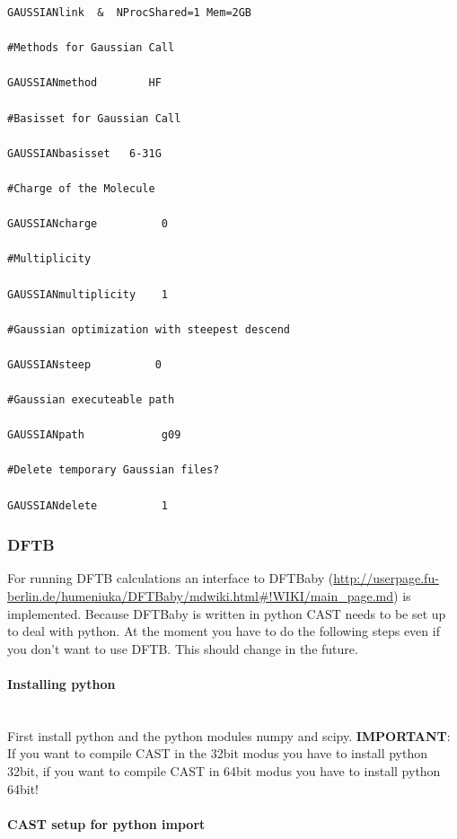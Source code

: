 \documentclass[10pt,a4paper]{article} %
\begin{document}
\begin{lstlisting}
GAUSSIANlink  &  NProcShared=1 Mem=2GB

#Methods for Gaussian Call

GAUSSIANmethod        HF

#Basisset for Gaussian Call

GAUSSIANbasisset   6-31G    

#Charge of the Molecule

GAUSSIANcharge          0

#Multiplicity 

GAUSSIANmultiplicity    1

#Gaussian optimization with steepest descend 

GAUSSIANsteep          0

#Gaussian executeable path 

GAUSSIANpath            g09 

#Delete temporary Gaussian files?

GAUSSIANdelete          1
\end{lstlisting}

\subsubsection{DFTB}

For running DFTB calculations an interface to DFTBaby (\url{http://userpage.fu-berlin.de/humeniuka/DFTBaby/mdwiki.html#!WIKI/main_page.md}) is implemented. Because DFTBaby is written in python CAST needs to be set up to deal with python. At the moment you have to do the following steps even if you don't want to use DFTB. This should change in the future.

\paragraph{Installing python}\mbox{}\\

First install python and the python modules numpy and scipy. \textbf{IMPORTANT}: If you want to compile CAST in the 32bit modus you have to install python 32bit, if you want to compile CAST in 64bit modus you have to install python 64bit!

\paragraph{CAST setup for python import}\mbox{}\\
\end{document}
